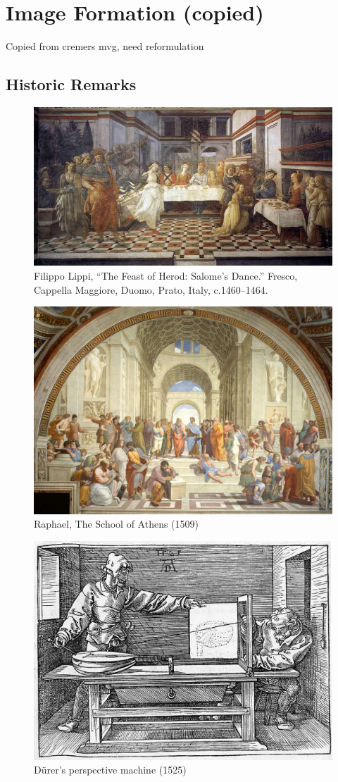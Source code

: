 \section{Image Formation (copied)}%
\label{sec:image-formation}

\alert{Copied from cremers mvg, need reformulation}

\subsection{Historic Remarks}%
\label{sub:historic_remarks}


\begin{figure}[h]
\centering
\includegraphics[width=0.5\columnwidth]{assets/img/lippi_feast_herod.jpg}
\caption{Filippo Lippi, ``The Feast of Herod: Salome's Dance.''
Fresco, Cappella Maggiore, Duomo, Prato, Italy, c.1460--1464.}%
\label{fig:lippi_feast_herod}
\end{figure}

\begin{figure}[h]
\centering
\includegraphics[width=0.5\columnwidth]{assets/img/raphael_school_athens.jpg}
\caption{Raphael, The School of Athens (1509)}%
\label{fig:raphael_school_athens}
\end{figure}

\begin{figure}[h]
\centering
\includegraphics[width=0.5\columnwidth]{assets/img/durer_perspective_machine.jpg}
\caption{D\"urer's perspective machine (1525)}%
\label{fig:durer_perspective_machine}
\end{figure}

